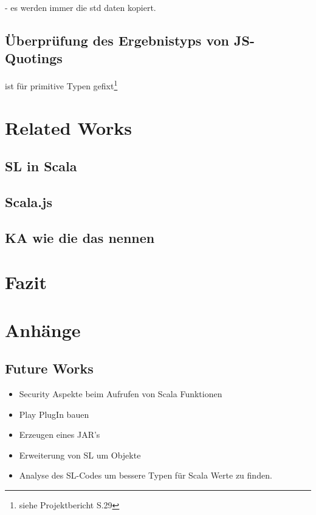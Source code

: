 \documentclass[12pt]{scrreprt}
\begin{document}
- es werden immer die std daten kopiert.



\section{Überprüfung des Ergebnistyps von \ac{JS}-Quotings}

ist für primitive Typen gefixt\footnote{siehe Projektbericht S.29}

\chapter{Related Works}
\label{chap:related-works}

\section{SL in Scala}

\section{Scala.js}
\label{sec:scala-js}

\section{KA wie die das nennen}

\chapter{Fazit}
\label{chap:conclusion}

\chapter{Anhänge}
\label{chap:anhänge}

\section{Future Works}
\label{sec:future-works}

\begin{itemize}
 \item{Security Aspekte beim Aufrufen von Scala Funktionen}
 \item{Play PlugIn bauen}
 \item{Erzeugen eines JAR's}
 \item{Erweiterung von SL um Objekte}
 \item{Analyse des SL-Codes um bessere Typen für Scala Werte zu finden.}
\end{itemize}
\end{document}
